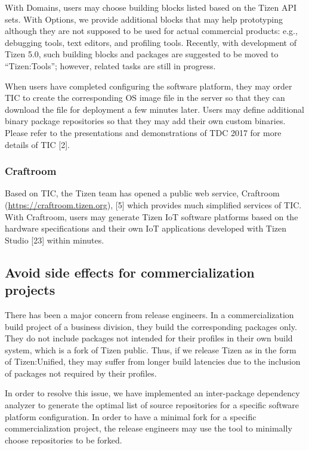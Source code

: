 With Domains, users may choose building blocks listed based on the Tizen API sets. With Options, we provide additional blocks that may help prototyping although they are not supposed to be used for actual commercial products: e.g., debugging tools, text editors, and profiling tools. Recently, with development of Tizen 5.0, such building blocks and packages are suggested to be moved to “Tizen:Tools”; however, related tasks are still in progress.


When users have completed configuring the software platform, they may order TIC to create the corresponding OS image file in the server so that they can download the file for deployment a few minutes later. Users may define additional binary package repositories so that they may add their own custom binaries. Please refer to the presentations and demonstrations of TDC 2017 for more details of TIC [2].


\subsubsection{Craftroom}

Based on TIC, the Tizen team has opened a public web service, Craftroom (\url{https://craftroom.tizen.org}), [5] which provides much simplified services of TIC. With Craftroom, users may generate Tizen IoT software platforms based on the hardware specifications and their own IoT applications developed with Tizen Studio [23] within minutes.

\subsection{Avoid side effects for commercialization projects}

There has been a major concern from release engineers. In a commercialization build project of a business division, they build the corresponding packages only. They do not include packages not intended for their profiles in their own build system, which is a fork of Tizen public. Thus, if we release Tizen as in the form of Tizen:Unified, they may suffer from longer build latencies due to the inclusion of packages not required by their profiles.


In order to resolve this issue, we have implemented an inter-package dependency analyzer to generate the optimal list of source repositories for a specific software platform configuration. In order to have a minimal fork for a specific commercialization project, the release engineers may use the tool to minimally choose repositories to be forked.


